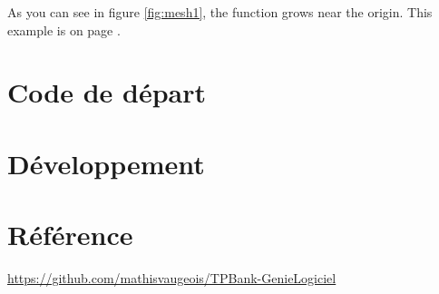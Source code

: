 \documentclass{article}
\begin{document}
As you can see in figure \ref{fig:mesh1}, the function grows near the origin. This example is on page \pageref{fig:mesh1}.

\section{Code de départ}

\section{Développement}

\section*{Référence}
\url{https://github.com/mathisvaugeois/TPBank-GenieLogiciel}
\end{document}
